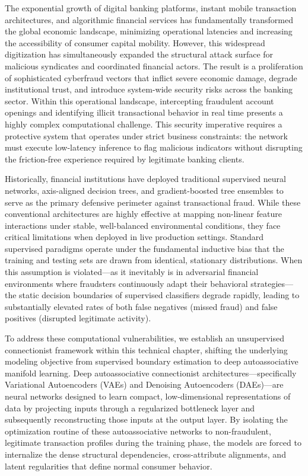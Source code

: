 The exponential growth of digital banking platforms, instant mobile transaction architectures, and algorithmic financial services has fundamentally transformed the global economic landscape, minimizing operational latencies and increasing the accessibility of consumer capital mobility. However, this widespread digitization has simultaneously expanded the structural attack surface for malicious syndicates and coordinated financial actors. The result is a proliferation of sophisticated cyberfraud vectors that inflict severe economic damage, degrade institutional trust, and introduce system-wide security risks across the banking sector. Within this operational landscape, intercepting fraudulent account openings and identifying illicit transactional behavior in real time presents a highly complex computational challenge. This security imperative requires a protective system that operates under strict business constraints: the network must execute low-latency inference to flag malicious indicators without disrupting the friction-free experience required by legitimate banking clients.

Historically, financial institutions have deployed traditional supervised neural networks, axis-aligned decision trees, and gradient-boosted tree ensembles to serve as the primary defensive perimeter against transactional fraud. While these conventional architectures are highly effective at mapping non-linear feature interactions under stable, well-balanced environmental conditions, they face critical limitations when deployed in live production settings. Standard supervised paradigms operate under the fundamental inductive bias that the training and testing sets are drawn from identical, stationary distributions. When this assumption is violated---as it inevitably is in adversarial financial environments where fraudsters continuously adapt their behavioral strategies---the static decision boundaries of supervised classifiers degrade rapidly, leading to substantially elevated rates of both false negatives (missed fraud) and false positives (disrupted legitimate activity).

To address these computational vulnerabilities, we establish an unsupervised connectionist framework within this technical chapter, shifting the underlying modeling objective from supervised boundary estimation to deep autoassociative manifold learning. Deep autoassociative connectionist architectures---specifically Variational Autoencoders (VAEs) and Denoising Autoencoders (DAEs)---are neural networks designed to learn compact, low-dimensional representations of data by projecting inputs through a regularized bottleneck layer and subsequently reconstructing those inputs at the output layer. By isolating the optimization routine of these autoassociative networks to non-fraudulent, legitimate transaction profiles during the training phase, the models are forced to internalize the dense structural dependencies, cross-attribute alignments, and latent regularities that define normal consumer behavior.

